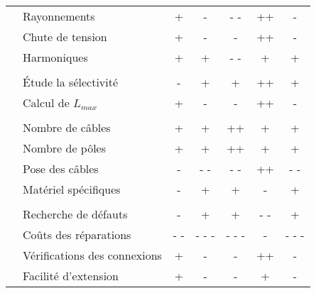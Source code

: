 \begin{xltabular}{\linewidth}{X l c c c c c}
\middashrule
& Rayonnements 					& + & - & - - & ++ & - \\
														& Chute de tension					&  + & - & - & ++ & - \\
														& Harmoniques						&  + & + & - - & + & + \\
\addlinespace
{} \\
\middashrule
					 		& \'Etude la sélectivité 			& - & + & + & ++ & + \\
														& Calcul de $L_{max}$			& + & - & - & ++ & - \\
\addlinespace
{}\\
\middashrule
					 		& Nombre de câbles	 			& + & + & ++ & + & + \\
														& Nombre de pôles		 			& + & + & ++ & + & + \\
														& Pose des câbles		 			& - & - - & - - & ++ & - - \\
														& Matériel spécifiques	 		& - & + & + & - & + \\
\noalign{\break} %
 \\
\middashrule
							& Recherche de défauts			& - & + & + & - - & + \\
														& Coûts des réparations			& - - & - - - & - - - & - &  - - - \\
														& Vérifications des connexions& + & - & - & ++ & - \\
														& Facilité d'extension				& + & - & - & + & - \\
\end{xltabular}
%

